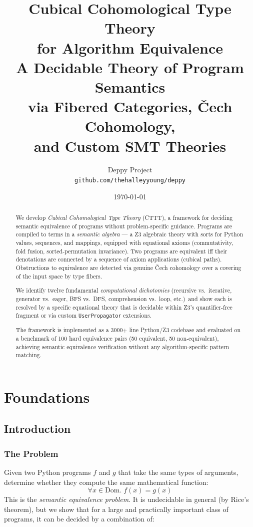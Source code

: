 \documentclass[11pt,a4paper]{report}
\title{
  \textbf{Cubical Cohomological Type Theory}\\
  \textbf{for Algorithm Equivalence}\\[1em]
  \large A Decidable Theory of Program Semantics\\
  via Fibered Categories, \v{C}ech Cohomology,\\
  and Custom SMT Theories
}
\author{
  Deppy Project\\
  \texttt{github.com/thehalleyyoung/deppy}
}
\date{\today}
\theoremstyle{definition}
\theoremstyle{plain}
\begin{document}
\maketitle

\begin{abstract}
We develop \emph{Cubical Cohomological Type Theory} (CTTT), a framework
for deciding semantic equivalence of programs without problem-specific
guidance.  Programs are compiled to terms in a \emph{semantic algebra}
--- a Z3 algebraic theory with sorts for Python values, sequences,
and mappings, equipped with equational axioms (commutativity, fold
fusion, sorted-permutation invariance).  Two programs are equivalent
iff their denotations are connected by a sequence of axiom applications
(cubical paths).  Obstructions to equivalence are detected via genuine
\v{C}ech cohomology over a covering of the input space by type fibers.

We identify twelve fundamental \emph{computational dichotomies} (recursive
vs.\ iterative, generator vs.\ eager, BFS vs.\ DFS, comprehension vs.\
loop, etc.)\ and show each is resolved by a specific equational theory
that is decidable within Z3's quantifier-free fragment or via custom
\texttt{UserPropagator} extensions.

The framework is implemented as a 3000+ line Python/Z3 codebase and
evaluated on a benchmark of 100 hard equivalence pairs (50 equivalent,
50 non-equivalent), achieving semantic equivalence verification without
any algorithm-specific pattern matching.
\end{abstract}

\tableofcontents


\part{Foundations}

\chapter{Introduction}
\label{ch:intro}

\section{The Problem}

Given two Python programs $f$ and $g$ that take the same types of
arguments, determine whether they compute the same mathematical
function:
\[
  \forall x \in \mathrm{Dom}.\; f(x) = g(x)
\]
This is the \emph{semantic equivalence problem}.  It is undecidable in
general (by Rice's theorem), but we show that for a large and
practically important class of programs, it can be decided by a
combination of:
\end{document}
